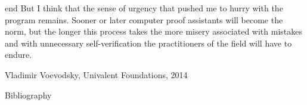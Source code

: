 \documentclass{beamer}
\begin{document}
\begin{frame}{end}
	But I think that the sense of urgency that pushed me to hurry with the program remains. Sooner or later computer proof assistants will become the norm, but the longer this process takes the more misery associated with mistakes and with unnecessary self-verification the practitioners of the field will have to endure.

	Vladimir Voevodsky, Univalent Foundations, 2014
\end{frame}

\begin{frame}{Bibliography}
	\nocite{*}
	
\end{frame}
\end{document}
